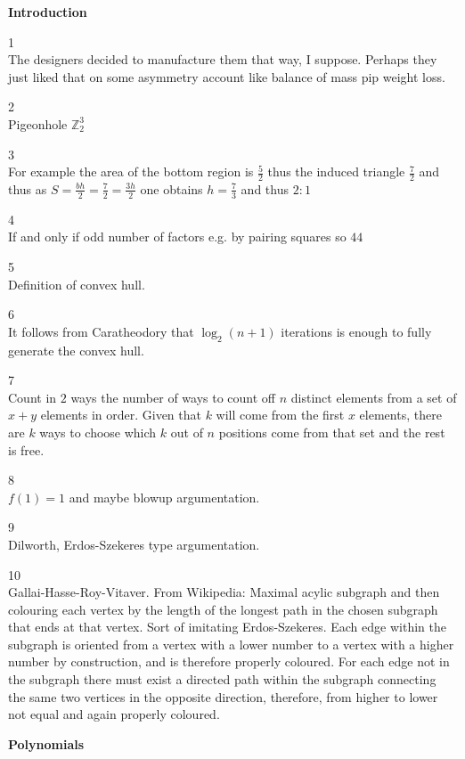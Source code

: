 \Large

\textbf{Introduction}

1 \\
The designers decided to manufacture them that way, I suppose. Perhaps they just liked that on some asymmetry account like balance of mass pip weight loss.

2 \\
Pigeonhole $\mathbb{Z}_2^3$

3 \\
For example the area of the bottom region is $\frac{5}{2}$ thus the induced triangle $\frac{7}{2}$ and thus as $S=\frac{bh}{2}=\frac{7}{2}=\frac{3h}{2}$ one obtains $h=\frac{7}{3}$ and thus $\boxed{2:1}$

4 \\
If and only if odd number of factors e.g. by pairing squares so $\boxed{44}$

5 \\
Definition of convex hull.

6 \\
It follows from Caratheodory that $\log_2(n+1)$ iterations is enough to fully generate the convex hull.

7 \\
Count in $2$ ways the number of ways to count off $n$ distinct elements from a set of $x+y$ elements in order. Given that $k$ will come from the first $x$ elements, there are $k$ ways to choose which $k$ out of $n$ positions come from that set and the rest is free.

8 \\
$f(1)=1$ and maybe blowup argumentation.

9 \\
Dilworth, Erdos-Szekeres type argumentation.

10 \\
Gallai-Hasse-Roy-Vitaver. From Wikipedia: Maximal acylic subgraph and then colouring each vertex by the length of the longest path in the chosen subgraph that ends at that vertex. Sort of imitating Erdos-Szekeres. Each edge within the subgraph is oriented from a vertex with a lower number to a vertex with a higher number by construction, and is therefore properly coloured. For each edge not in the subgraph there must exist a directed path within the subgraph connecting the same two vertices in the opposite direction, therefore, from higher to lower not equal and again properly coloured.

\newpage

\textbf{Polynomials}

